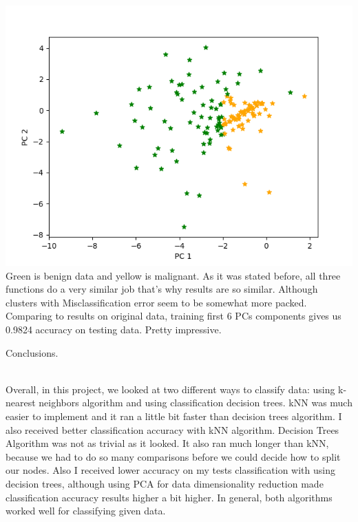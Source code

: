 \documentclass[12pt, letterpaper]{article}
\begin{document}
\begin{enumerate}[label=\Roman*.]
\begin{enumerate}[label=\arabic*.]
		\includegraphics[scale=0.5]{../images/clusters_error_Depth_.png} \\ 
		
		Green is benign data and yellow is malignant. As it was stated before, all three functions do a very similar job that's why results are so similar. Although clusters with Misclassification error seem to be somewhat more packed. \\
		Comparing to results on original data, training first 6 PCs components gives us 0.9824 accuracy on testing data. Pretty impressive. \\
		
	\end{enumerate}
	
	{\bf \item Conclusions.}\\
	 
	 Overall, in this project, we looked at two different ways to classify data: using k-nearest neighbors algorithm and using classification decision trees. kNN was much easier to implement and it ran a little bit faster than decision trees algorithm. I also received better classification accuracy with kNN algorithm. Decision Trees Algorithm was not as trivial as it looked. It also ran much longer than kNN, because we had to do so many comparisons  before we could decide how to split our nodes. Also I received lower accuracy on my tests classification with using decision trees, although using PCA for data dimensionality reduction made classification accuracy results higher a bit higher. In general, both algorithms worked well for classifying given data. 
\end{enumerate}
	
	
	
	
	
	
	
\end{document}
